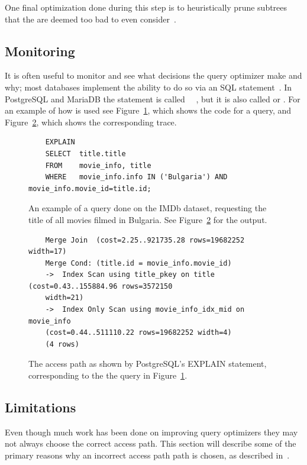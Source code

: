 One final optimization done during this step is to heuristically prune
subtrees that the are deemed too bad to even
consider~\cite{ono_1990_measuring_mtcojeiqo}.

\subsection{Monitoring}
It is often useful to monitor and see what decisions the query optimizer make
and why; most databases implement the ability to do so via an SQL
statement~\cite[p. 34]{lahdenmaki_2005_relational_rdidatodossea}. In PostgreSQL
and MariaDB the statement is called
~\cite{postgresql_pd9e}~\cite{explain_emkb}, but it is also called
 or . For an example of how  is
used see Figure~\ref{fig:sql:explainquery}, which shows the code for a query,
and Figure~\ref{fig:sql:explaintrace}, which shows the corresponding trace.

\begin{figure}[ht]
  \begin{verbatim}
    EXPLAIN
    SELECT  title.title
    FROM    movie_info, title
    WHERE   movie_info.info IN ('Bulgaria') AND movie_info.movie_id=title.id;
  \end{verbatim}
  \caption[An example query to ]{An example of a query done on the
    IMDb dataset, requesting the title of all movies filmed in Bulgaria. See
    Figure~\ref{fig:sql:explaintrace} for the
    output.}\label{fig:sql:explainquery}
\end{figure}

\begin{figure}[ht]
  \begin{lstlisting}
    Merge Join  (cost=2.25..921735.28 rows=19682252 width=17)
    Merge Cond: (title.id = movie_info.movie_id)
    ->  Index Scan using title_pkey on title  (cost=0.43..155884.96 rows=3572150
    width=21)
    ->  Index Only Scan using movie_info_idx_mid on movie_info
    (cost=0.44..511110.22 rows=19682252 width=4)
    (4 rows)
  \end{lstlisting}
  \caption[An example of an  trace]{The access path as shown by
    PostgreSQL's EXPLAIN statement, corresponding to the the query in
    Figure~\ref{fig:sql:explainquery}.}\label{fig:sql:explaintrace}
\end{figure}

\subsection{Limitations}
Even though much work has been done on improving query optimizers they may not
always choose the correct access path. This section will describe some of the
primary reasons why an incorrect access path path is chosen, as described
in~\cite[Ch. 14]{lahdenmaki_2005_relational_rdidatodossea}.

